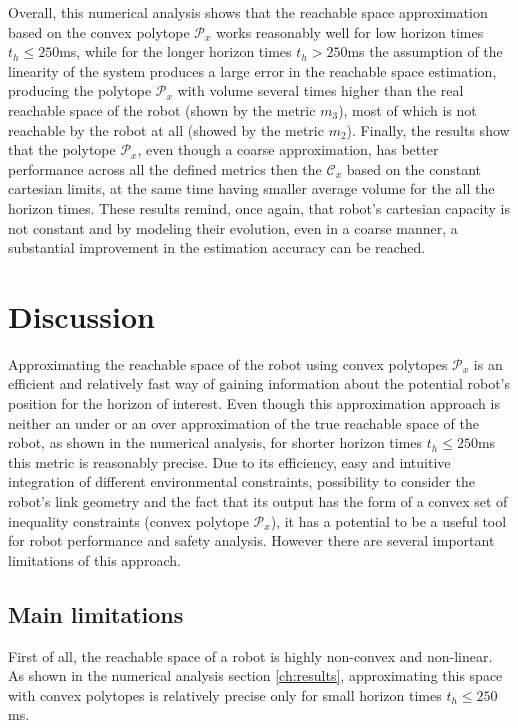Overall, this numerical analysis shows that the reachable space approximation based on the convex polytope $\mathcal{P}_x$ works reasonably well for low horizon times $t_h\leq250$ms, while for the longer horizon times $t_h>250$ms the assumption of the linearity of the system produces a large error in the reachable space estimation, producing the polytope $\mathcal{P}_x$ with volume several times higher than the real reachable space of the robot (shown by the metric $m_3$), most of which is not reachable by the robot at all (showed by the metric $m_2$). Finally, the results show that the polytope $\mathcal{P}_x$, even though a coarse approximation, has better performance across all the defined metrics then the $\mathcal{C}_x$ based on the constant cartesian limits, at the same time having smaller average volume for the all the horizon times. These results remind, once again, that robot's cartesian capacity is not constant and by modeling their evolution, even in a coarse manner, a substantial improvement in the estimation accuracy can be reached.
\section{Discussion}
\label{ch:discussion}
Approximating the reachable space of the robot using convex polytopes $\mathcal{P}_x$ is an efficient and relatively fast way of gaining information about the potential robot's position for the horizon of interest. Even though this approximation approach is neither an under or an over approximation of the true reachable space of the robot, as shown in the numerical analysis, for shorter horizon times $t_h\leq250$ms this metric is reasonably precise. Due to its efficiency, easy and intuitive integration of different environmental constraints, possibility to consider the robot's link geometry and the fact that its output has the form of a convex set of inequality constraints (convex polytope $\mathcal{P}_x$), it has a potential to be a useful tool for robot performance and safety analysis. However there are several important limitations of this approach.

\subsection{Main limitations}
First of all, the reachable space of a robot is highly non-convex and non-linear. As shown in the numerical analysis section \ref{ch:results}, approximating this space with convex polytopes is relatively precise only for small horizon times $t_h\leq250$ms.

